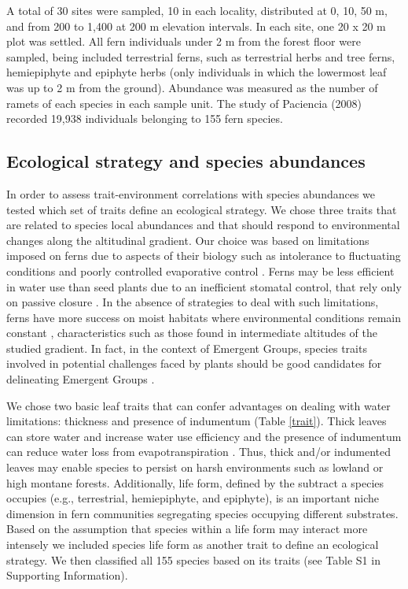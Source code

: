 \documentclass[12pt]{article}
\begin{document}
A total of 30 sites were sampled, 10 in each locality,
distributed at 0, 10, 50 m, and from 200 to 1,400 at 200 m elevation
intervals. In each site, one 20 x 20 m plot was settled. 
All fern individuals under 2 m from the forest floor were sampled, being
included terrestrial ferns, such as terrestrial herbs and tree ferns,
hemiepiphyte and epiphyte herbs (only individuals in which the lowermost leaf was up to 2 m from the ground). 
Abundance was measured as the number
of ramets of each species in each sample unit. The study of Paciencia (2008) 
recorded
19,938 individuals belonging to 155 fern species. 

\subsection*{Ecological strategy and species abundances}
In order to assess trait-environment correlations with species abundances we tested which set of traits define an ecological strategy. We chose three traits
that are related to species local abundances and that 
should respond to environmental changes 
along the altitudinal gradient. 
Our choice was based on limitations imposed on ferns due to aspects of
their biology such as intolerance to fluctuating conditions and poorly
controlled evaporative control \citep{Page2002}. Ferns may be less efficient in 
water use than seed plants due to an inefficient stomatal control, that rely 
only on passive closure \citep{Brodribb2011}. 
In the absence of
strategies to deal with such limitations, ferns have more success on
moist habitats where environmental conditions remain constant
\citep{Page2002}, characteristics such as those found in intermediate altitudes 
of the studied gradient.
In fact, in the context of Emergent Groups, species traits involved in potential 
challenges faced by plants should be good candidates for delineating Emergent Groups 
\citep{Herault2007}.

We chose two basic
leaf traits that can confer advantages on dealing with water limitations:
thickness and presence of 
indumentum (Table \ref{trait}). Thick leaves can store water 
and increase water use efficiency and the presence of indumentum can reduce 
water loss from evapotranspiration \citep{Watkins2012}. Thus, thick and/or
indumented leaves may enable species to persist on harsh environments
such as lowland or high montane forests. 
Additionally, life form, defined by the subtract
a species occupies (e.g., terrestrial, hemiepiphyte, and epiphyte), is an important
niche dimension in fern communities segregating species
occupying different substrates. 
Based on the assumption that species within a life form may interact
more intensely we included species life form as another trait to define an 
ecological strategy. We then classified all 155 species based on its traits (see Table S1 in Supporting Information). 
\end{document}
